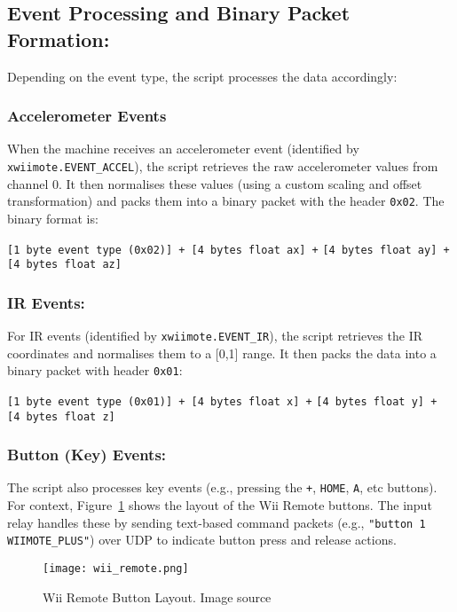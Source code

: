 \subsection{Event Processing and Binary Packet Formation:}
Depending on the event type, the script processes the data accordingly:

\subsubsection{Accelerometer Events}
When the machine receives an accelerometer event (identified by \linebreak \texttt{xwiimote.EVENT\_ACCEL}), the script retrieves the raw accelerometer values from channel 0. It then normalises these values (using a custom scaling and offset transformation) and packs them into a binary packet with the header \texttt{0x02}. The binary format is:
\begin{center}
	\texttt{[1 byte event type (0x02)] + [4 bytes float ax] +}
	\texttt{[4 bytes float ay] + [4 bytes float az]}
\end{center}

\subsubsection{IR Events:}
For IR events (identified by \texttt{xwiimote.EVENT\_IR}), the script retrieves the IR coordinates and normalises them to a [0,1] range. It then packs the data into a binary packet with header \texttt{0x01}:
\begin{center}
	\texttt{[1 byte event type (0x01)] + [4 bytes float x] +}
	\texttt{[4 bytes float y] + [4 bytes float z]}
\end{center}

\subsubsection{Button (Key) Events:}
The script also processes key events (e.g., pressing the \texttt{+}, \texttt{HOME}, \texttt{A}, etc buttons). For context, Figure~\ref{fig:wiimote_buttons} shows the layout of the Wii Remote buttons. The input relay handles these by sending text-based command packets (e.g., \texttt{"button 1 WIIMOTE\_PLUS"}) over UDP to indicate button press and release actions.

\begin{figure}[h]
	\centering
	\texttt{[image: wii\_remote.png]}
	\caption{Wii Remote Button Layout. Image source\cite{wiimoteButtons}}
	\label{fig:wiimote_buttons}
\end{figure}


